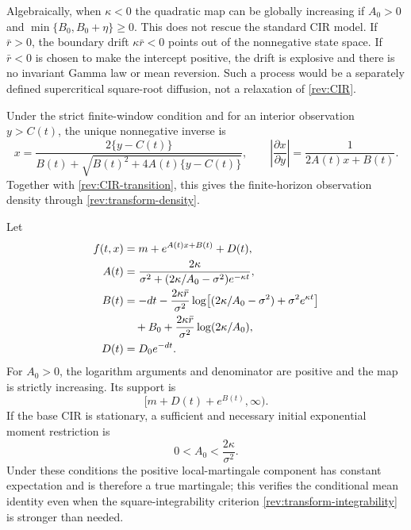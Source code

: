 \begin{remark}
Algebraically, when $\kappa<0$ the quadratic map can be globally increasing if
$A_0>0$ and $\min\{B_0,B_0+\eta\}\ge0$.  This does not rescue the standard CIR
model.  If $\bar r>0$, the boundary drift $\kappa\bar r<0$ points out of the
nonnegative state space.  If $\bar r<0$ is chosen to make the intercept positive,
the drift is explosive and there is no invariant Gamma law or mean reversion.
Such a process would be a separately defined supercritical square-root diffusion,
not a relaxation of \eqref{rev:CIR}.
\end{remark}

\begin{corollary}
\label{rev:cor-quadratic-inverse}
Under the strict finite-window condition and for an interior observation
$y>C(t)$, the unique nonnegative inverse is
\begin{equation}
x=\frac{2\{y-C(t)\}}
{B(t)+\sqrt{B(t)^2+4A(t)\{y-C(t)\}}},
\qquad
\left|\frac{\partial x}{\partial y}\right|
=\frac1{2A(t)x+B(t)}.
\label{rev:quadratic-inverse}
\end{equation}
Together with \eqref{rev:CIR-transition}, this gives the finite-horizon
observation density through \eqref{rev:transform-density}.
\end{corollary}

\begin{example}
\label{rev:ex-exponential-CIR}
Let
\begin{align}
f(t,x)&=m+e^{A(t)x+B(t)}+D(t),\label{rev:exp-CIR-transform}\\
A(t)&=\frac{2\kappa}
{\sigma^2+(2\kappa/A_0-\sigma^2)e^{-\kappa t}},
\label{rev:exp-CIR-A}\\
B(t)&=-dt-\frac{2\kappa\bar r}{\sigma^2}
\log\!\left[(2\kappa/A_0-\sigma^2)+\sigma^2e^{\kappa t}\right]
\notag\\
&\quad+B_0+
\frac{2\kappa\bar r}{\sigma^2}\log(2\kappa/A_0),
\label{rev:exp-CIR-B}\\
D(t)&=D_0e^{-dt}.
\label{rev:exp-CIR-D}
\end{align}
For $A_0>0$, the logarithm arguments and denominator are positive and the map
is strictly increasing.  Its support is
\begin{equation}
[m+D(t)+e^{B(t)},\infty).
\label{rev:exp-CIR-support}
\end{equation}
If the base CIR is stationary, a sufficient and necessary initial exponential
moment restriction is
\begin{equation}
0<A_0<\frac{2\kappa}{\sigma^2}.
\label{rev:exp-CIR-moment}
\end{equation}
Under these conditions the positive local-martingale component has constant
expectation and is therefore a true martingale; this verifies the conditional
mean identity even when the square-integrability criterion
\eqref{rev:transform-integrability} is stronger than needed.
\end{example}

